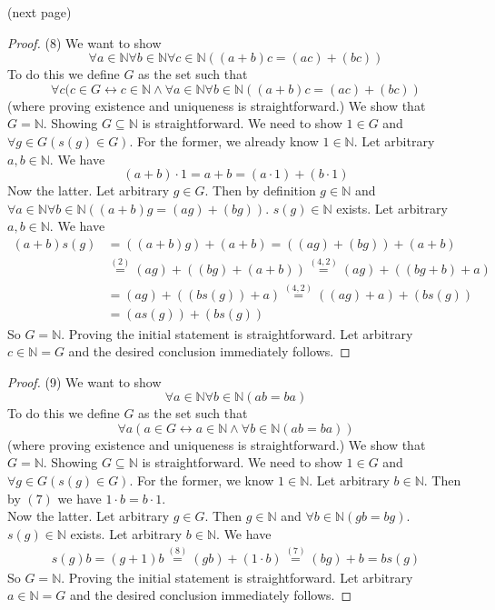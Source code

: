 \documentclass{report}
\begin{document}
\noindent(next page)\newpage
\begin{proof}(8)
We want to show
\begin{equation*}
\forall a\in\mathbb N\forall b\in\mathbb N\forall c\in\mathbb N((a+b)c=(ac)+(bc))
\end{equation*}
To do this we define $G$ as the set such that
\begin{equation*}
\forall c(c\in G\leftrightarrow c\in\mathbb N\land\forall a\in\mathbb N\forall b\in\mathbb N((a+b)c=(ac)+(bc))
\end{equation*}
(where proving existence and uniqueness is straightforward.) We show that $G=\mathbb N$.
Showing $G\subseteq\mathbb N$ is straightforward. We need to show $1\in G$ and $\forall g\in G(s(g)\in G)$.
For the former, we already know $1\in\mathbb N$. Let arbitrary $a,b\in\mathbb N$. We have
\begin{equation*}
(a+b)\cdot1=a+b=(a\cdot1)+(b\cdot1)
\end{equation*}
Now the latter. Let arbitrary $g\in G$. Then by definition $g\in\mathbb N$ and $\forall a\in\mathbb N\forall b\in\mathbb N((a+b)g=(ag)+(bg))$. $s(g)\in\mathbb N$ exists. 
Let arbitrary $a,b\in\mathbb N$. We have
\begin{align*}
(a+b)s(g)&=((a+b)g)+(a+b)=((ag)+(bg))+(a+b)\\
&\overset{(2)}{=}(ag)+((bg)+(a+b))\overset{(4,2)}{=}(ag)+((bg+b)+a)\\
&=(ag)+((bs(g))+a)\overset{(4,2)}{=}((ag)+a)+(bs(g))\\
&=(as(g))+(bs(g))
\end{align*}
So $G=\mathbb N$. Proving the initial statement is straightforward. Let arbitrary $c\in\mathbb N=G$
and the desired conclusion immediately follows.
\end{proof}
\begin{proof}(9)
We want to show
\begin{equation*}
\forall a\in\mathbb N\forall b\in\mathbb N(ab=ba)
\end{equation*}
To do this we define $G$ as the set such that
\begin{equation*}
\forall a(a\in G\leftrightarrow a\in\mathbb N\land\forall b\in\mathbb N(ab=ba))
\end{equation*}
(where proving existence and uniqueness is straightforward.) We show that $G=\mathbb N$.
Showing $G\subseteq\mathbb N$ is straightforward. We need to show $1\in G$ and $\forall g\in G(s(g)\in G)$.
For the former, we know $1\in\mathbb N$. Let arbitrary $b\in\mathbb N$. Then by $(7)$ we have
$1\cdot b=b\cdot 1$.\\
\indent Now the latter. Let arbitrary $g\in G$. Then $g\in\mathbb N$ and $\forall b\in\mathbb N(gb=bg)$. $s(g)\in\mathbb N$ exists. Let arbitrary $b\in\mathbb N$. We have
\begin{align*}
s(g)b=(g+1)b\overset{(8)}{=}(gb)+(1\cdot b)\overset{(7)}{=}(bg)+b=bs(g)
\end{align*}
So $G=\mathbb N$. Proving the initial statement is straightforward. Let arbitrary $a\in\mathbb N=G$
and the desired conclusion immediately follows.
\end{proof}
\end{document}
